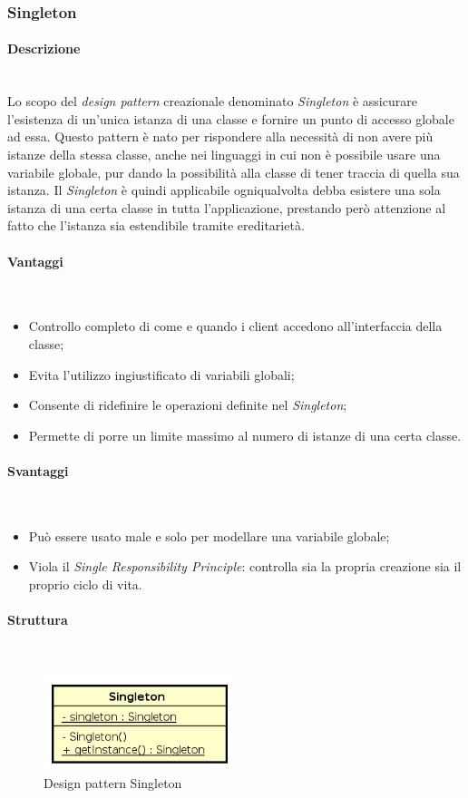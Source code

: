 \subsubsection{Singleton}
\paragraph{Descrizione} \mbox{} \\
Lo scopo del \textit{design pattern} creazionale denominato \textit{Singleton} è assicurare l’esistenza di un'unica istanza di una classe e fornire un punto di accesso globale ad essa. Questo pattern è nato per rispondere alla necessità di non avere più istanze della stessa classe, anche nei linguaggi in cui non è possibile usare una variabile globale, pur dando la possibilità alla classe di tener traccia di quella sua istanza. Il \textit{Singleton} è quindi applicabile ogniqualvolta debba esistere una sola istanza di una certa classe in tutta l’applicazione, prestando però attenzione al fatto che l’istanza sia estendibile tramite ereditarietà.
\paragraph{Vantaggi} \mbox{} \\
\begin{itemize}
\item Controllo completo di come e quando i client accedono all’interfaccia della classe;
\item Evita l’utilizzo ingiustificato di variabili globali;
\item Consente di ridefinire le operazioni definite nel \textit{Singleton};
\item Permette di porre un limite massimo al numero di istanze di una certa classe.
\end{itemize}
\paragraph{Svantaggi} \mbox{} \\
\begin{itemize}
\item Può essere usato male e solo per modellare una variabile globale;
\item Viola il \textit{Single Responsibility Principle}: controlla sia la propria creazione sia il proprio ciclo di vita.
\end{itemize}
\paragraph{Struttura} \mbox{} \\
\begin{figure}[H]
\centering
\includegraphics[width=0.5\textwidth]{res/sections/backend/singleton.png}
\caption{Design pattern Singleton}
\end{figure}
